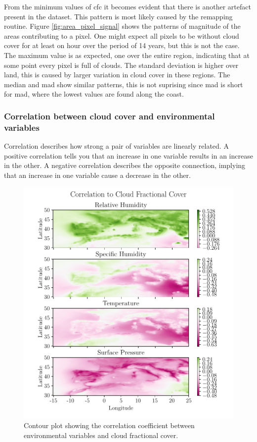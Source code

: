 From the minimum values of \acrshort{cfc} it becomes evident that there is another artefact present in the dataset. This pattern is most likely caused by the remapping routine. Figure \ref{fig:area_pixel_signal} shows the patterns of magnitude of the areas contributing to a pixel. One might expect all pixels to be without cloud cover for at least on hour over the period of 14 years, but this is not the case. The maximum value is as expected, one over the entire region, indicating that at some point every pixel is full of clouds. The standard deviation is higher over land, this is caused by larger variation in cloud cover in these regions. The median and \acrshort{mad} 
show similar patterns, this is not suprising since \acrshort{mad} is short for \acrlong{mad}, where the lowest values are found along the coast.

\subsubsection{Correlation between cloud cover and environmental variables}
Correlation describes how strong a pair of variables are linearly related. A positive correlation tells you that an increase in one variable results in an increase in the other. A negative correlation describes the opposite connection, implying that an increase in one variable cause a decrease in the other.
\begin{figure}[ht]
    \centering
    \includegraphics{python_figs/correlation_figure.pdf}
    \caption{Contour plot showing the correlation coefficient between environmental variables and cloud fractional cover.}
    \label{fig:correlation_tcc_vs_envio}
\end{figure}

